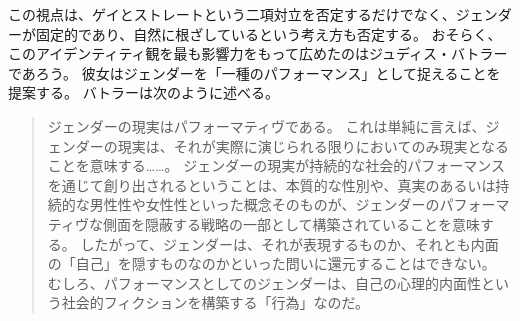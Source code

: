 \documentclass[paper=a4,book,openany]{jlreq}
\newcommand{\ig}[1]{}           %
\begin{document}
この視点は、ゲイとストレートという二項対立を否定するだけでなく、ジェンダーが固定的であり、自然に根ざしているという考え方も否定する。
おそらく、このアイデンティティ観を最も影響力をもって広めたのはジュディス・バトラー\ig{(Judith Butler)}であろう。
彼女はジェンダーを「一種のパフォーマンス」として捉えることを提案する。
バトラーは次のように述べる。

\begin{quote}
ジェンダーの現実はパフォーマティヴである。
これは単純に言えば、ジェンダーの現実は、それが実際に演じられる限りにおいてのみ現実となることを意味する……。
ジェンダーの現実が持続的な社会的パフォーマンスを通じて創り出されるということは、本質的な性別や、真実のあるいは持続的な男性性や女性性といった概念そのものが、ジェンダーのパフォーマティヴな側面を隠蔽する戦略の一部として構築されていることを意味する。
したがって、ジェンダーは、それが表現するものか、それとも内面の「自己」を隠すものなのかといった問いに還元することはできない。
むしろ、パフォーマンスとしてのジェンダーは、自己の心理的内面性という社会的フィクションを構築する「行為」なのだ。\citep[pp.527-528]{butler88:_perfor_acts_gender_const}

\end{quote}
\end{document}
